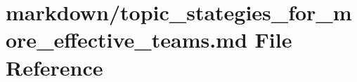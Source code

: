 \hypertarget{topic__stategies__for__more__effective__teams_8md}{}\section{markdown/topic\+\_\+stategies\+\_\+for\+\_\+more\+\_\+effective\+\_\+teams.md File Reference}
\label{topic__stategies__for__more__effective__teams_8md}
